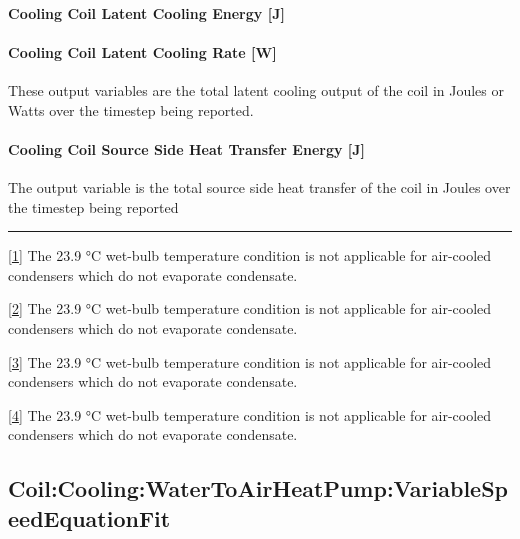 \paragraph{Cooling Coil Latent Cooling Energy {[}J{]}}\label{cooling-coil-latent-cooling-energy-j-6}

\paragraph{Cooling Coil Latent Cooling Rate {[}W{]}}\label{cooling-coil-latent-cooling-rate-w-4}

These output variables are the total latent cooling output of the coil in Joules or Watts over the timestep being reported.

\paragraph{Cooling Coil Source Side Heat Transfer Energy {[}J{]}}\label{cooling-coil-source-side-heat-transfer-energy-j-3}

The output variable is the total source side heat transfer of the coil in Joules over the timestep being reported

\begin{center}\rule{0.5\linewidth}{0.4pt}\end{center}

\protect\hyperlink{ux5fftnref1}{{[}1{]}} The 23.9 °C wet-bulb temperature condition is not applicable for air-cooled condensers which do not evaporate condensate.

\protect\hyperlink{ux5fftnref2}{{[}2{]}} The 23.9 °C wet-bulb temperature condition is not applicable for air-cooled condensers which do not evaporate condensate.

\protect\hyperlink{ux5fftnref3}{{[}3{]}} The 23.9 °C wet-bulb temperature condition is not applicable for air-cooled condensers which do not evaporate condensate.

\protect\hyperlink{ux5fftnref4}{{[}4{]}} The 23.9 °C wet-bulb temperature condition is not applicable for air-cooled condensers which do not evaporate condensate.

\subsection{Coil:Cooling:WaterToAirHeatPump:VariableSpeedEquationFit}\label{coilcoolingwatertoairheatpumpvariablespeedequationfit}


